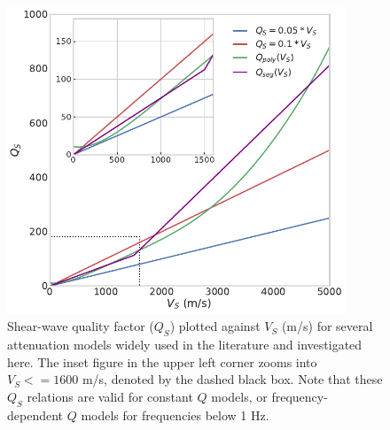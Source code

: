 




\begin{figure}[!ht]
  \centering
  \includegraphics[width=0.9\textwidth,height=0.85\textheight,keepaspectratio]{figures/figure_highf_S1.pdf}
  \caption{
  Shear-wave quality factor ($Q_S$) plotted against $V_S$ (m/s) for several attenuation models widely used in the literature  and investigated here. The inset figure in the upper left corner zooms into $V_S <= 1600$ m/s, denoted by the dashed black box. Note that these $Q_S$ relations are valid for constant $Q$ models, or frequency-dependent $Q$ models for frequencies below 1 Hz.}
  \label{fig:highf-A1}
\end{figure}
\clearpage

